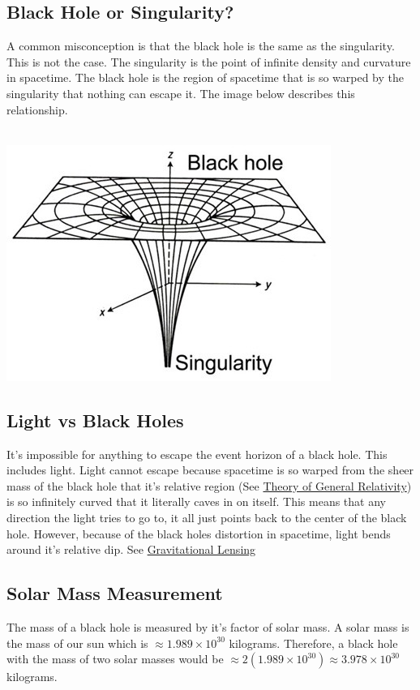 \documentclass{article}
\begin{document}
\subsection{Black Hole or Singularity?}
A common misconception is that the black hole is the same as the singularity. This is not the case. The singularity is the point of infinite density and curvature in spacetime. The black hole is the region of spacetime that is so warped by the singularity that nothing can escape it. The image below describes this relationship.\\\\
\begin{minipage}{0.5\textwidth}
    \includegraphics[scale=0.5]{images/black_hole.png}
\end{minipage}

\subsection{Light vs Black Holes}
It's impossible for anything to escape the event horizon of a black hole. This includes light. Light cannot escape because spacetime is so warped from the sheer mass of the black hole that it's relative region (See \hyperref[sec:generalrelativity]{Theory of General Relativity}) is so infinitely curved that it literally caves in on itself. This means that any direction the light tries to go to, it all just points back to the center of the black hole.
However, because of the black holes distortion in spacetime, light bends around it's relative dip. See \hyperref[sec:gravitational_lensing]{Gravitational Lensing}

\subsection{Solar Mass Measurement}
The mass of a black hole is measured by it's factor of solar mass. A solar mass is the mass of our sun which is \hyperref[constants]{$\approx 1.989 \times 10^{30}$} kilograms. Therefore, a black hole with the mass of two solar masses would be $\approx 2(1.989 \times 10^{30}) \approx 3.978 \times 10^{30}$ kilograms.
\end{document}
